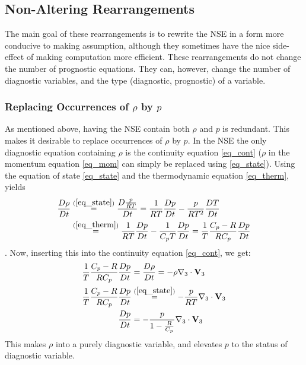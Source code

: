 
\subsection{Non-Altering Rearrangements}
The main goal of these rearrangements is to rewrite the NSE in a form more conducive to making assumption, although they sometimes have the nice side-effect of making computation more efficient.
These rearrangements do not change the number of prognostic equations.
They can, however, change the number of diagnostic variables, and the type (diagnostic, prognostic) of a variable.
\subsubsection{Replacing Occurrences of $\rho$ by $p$}\label{subsec_rho_p}
As mentioned above, having the NSE contain both $\rho$ and $p$ is redundant.
This makes it desirable to replace occurrences of $\rho$ by $p$.
In the NSE the only diagnostic equation containing $\rho$ is the continuity equation \ref{eq_cont} ($\rho$ in the momentum equation \ref{eq_mom} can simply be replaced using \ref{eq_state}).
Using the equation of state \ref{eq_state} and the thermodynamic equation \ref{eq_therm}, yields
\begin{align*}
\frac{D\rho}{Dt} &\stackrel{(\ref{eq_state})}{=} \frac{D\frac{p}{RT}}{Dt} = \frac{1}{RT}\frac{Dp}{Dt}-\frac{p}{RT^2}\frac{DT}{Dt}\\
&\stackrel{(\ref{eq_therm})}{=} \frac{1}{RT}\frac{Dp}{Dt}-\frac{1}{C_pT}\frac{Dp}{Dt} = \frac{1}{T}\frac{C_p-R}{RC_p}\frac{Dp}{Dt}
\end{align*}.
Now, inserting this into the continuity equation \ref{eq_cont}, we get:
\begin{align*}
\frac{1}{T}\frac{C_p-R}{RC_p}\frac{Dp}{Dt} &= \frac{D\rho}{Dt} = -\rho \nabla _3 \cdot \textbf{V}_3\\
\frac{1}{T}\frac{C_p-R}{RC_p}\frac{Dp}{Dt} &\stackrel{(\ref{eq_state})}{=} -\frac{p}{RT} \nabla _3 \cdot \textbf{V}_3\\
\frac{Dp}{Dt} &= - \frac{p}{1-\frac{R}{C_p}} \nabla _3 \cdot \textbf{V}_3
\end{align*}
This makes $\rho$ into a purely diagnostic variable, and elevates $p$ to the status of diagnostic variable.


